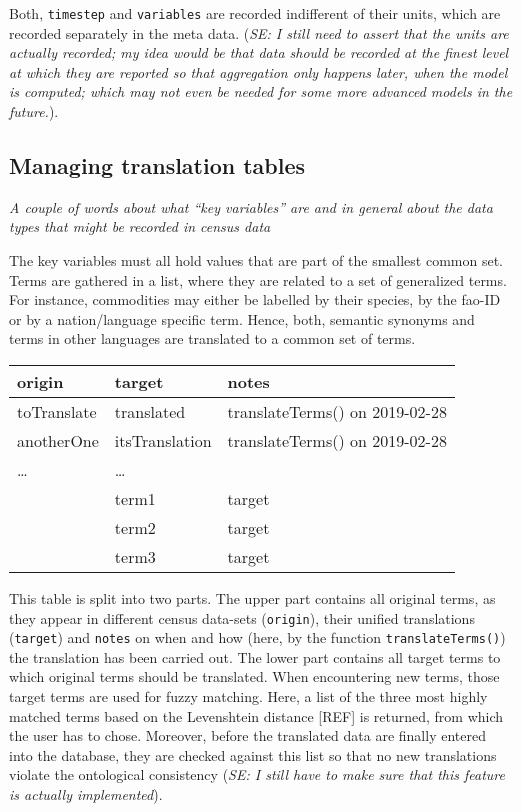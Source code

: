 \documentclass[12pt,]{article}
\begin{document}
Both, \texttt{timestep} and \texttt{variables} are recorded indifferent of their units, which are recorded separately in the meta data. (\emph{SE: I still need to assert that the units are actually recorded; my idea would be that data should be recorded at the finest level at which they are reported so that aggregation only happens later, when the model is computed; which may not even be needed for some more advanced models in the future.}).

\hypertarget{managing-translation-tables}{%
\subsection{Managing translation tables}\label{managing-translation-tables}}

\emph{A couple of words about what ``key variables'' are and in general about the data types that might be recorded in census data}

The key variables must all hold values that are part of the smallest common set.
Terms are gathered in a list, where they are related to a set of generalized terms.
For instance, commodities may either be labelled by their species, by the fao-ID or by a nation/language specific term.
Hence, both, semantic synonyms and terms in other languages are translated to a common set of terms.

\begin{longtable}[]{@{}lll@{}}
\toprule
origin & target & notes\tabularnewline
\midrule
\endhead
toTranslate & translated & translateTerms() on 2019-02-28\tabularnewline
anotherOne & itsTranslation & translateTerms() on 2019-02-28\tabularnewline
\ldots{} & \ldots{} &\tabularnewline
& term1 & target\tabularnewline
& term2 & target\tabularnewline
& term3 & target\tabularnewline
\bottomrule
\end{longtable}

This table is split into two parts. The upper part contains all original terms, as they appear in different census data-sets (\texttt{origin}), their unified translations (\texttt{target}) and \texttt{notes} on when and how (here, by the function \texttt{translateTerms()}) the translation has been carried out.
The lower part contains all target terms to which original terms should be translated.
When encountering new terms, those target terms are used for fuzzy matching.
Here, a list of the three most highly matched terms based on the Levenshtein distance {[}REF{]} is returned, from which the user has to chose.
Moreover, before the translated data are finally entered into the database, they are checked against this list so that no new translations violate the ontological consistency (\emph{SE: I still have to make sure that this feature is actually implemented}).
\end{document}
